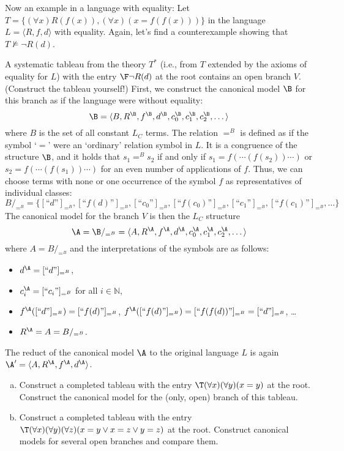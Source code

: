 \begin{example}
    Now an example in a language with equality: Let $T=\{(\forall x)R(f(x)),(\forall x)(x=f(f(x)))\}$ in the language $L=\langle R,f,d \rangle$ with equality. Again, let's find a counterexample showing that $T\not\models\neg R(d)$. 

    A systematic tableau from the theory $T^*$ (i.e., from $T$ extended by the axioms of equality for $L$) with the entry $\F\neg R(d)$ at the root contains an open branch $V$. (Construct the tableau yourself!) First, we construct the canonical model $\B$ for this branch as if the language were without equality:
    $$
    \B=\langle B,R^\B,f^\B,d^\B,c_0^\B,c_1^\B,c_2^\B,\dots\rangle
    $$
    where $B$ is the set of all constant $L_C$ terms. The relation $=^B$ is defined as if the symbol `$=$' were an `ordinary' relation symbol in $L$. It is a congruence of the structure $\B$, and it holds that $s_1=^B s_2$ if and only if $s_1=f(\cdots (f(s_2))\cdots)$ or $s_2=f(\cdots (f(s_1))\cdots)$ for an even number of applications of $f$. Thus, we can choose terms with none or one occurrence of the symbol $f$ as representatives of individual classes:
    $$
        B/_{=^B} = \{[\text{``$d$''}]_{=^B},[\text{``$f(d)$''}]_{=^B},[\text{``$c_0$''}]_{=^B},[\text{``$f(c_0)$''}]_{=^B},[\text{``$c_1$''}]_{=^B},[\text{``$f(c_1)$''}]_{=^B},\dots\}
    $$
    The canonical model for the branch $V$ is then the $L_C$ structure 
    $$
    \A=\B/_{=^B}=\langle A,R^\A,f^\A,d^\A,c_0^\A,c_1^\A,c_2^\A,\dots\rangle
    $$
    where $A=B/_{=^B}$ and the interpretations of the symbols are as follows:
    \begin{itemize}
        \item $d^\A=[\text{``$d$''}]_{=^B}$,
        \item $c^\A_i=[\text{``$c_i$''}]_{=^B}$ for all $i\in \mathbb N$,
        \item $f^\A([\text{``$d$''}]_{=^B})=[\text{``$f(d)$''}]_{=^B}$, $f^\A([\text{``$f(d)$''}]_{=^B})=[\text{``$f(f(d))$''}]_{=^B}=[\text{``$d$''}]_{=^B}$, \dots
        \item $R^\A=A=B/_{=^B}$.
    \end{itemize}
    The reduct of the canonical model $\A$ to the original language $L$ is again $\A'=\langle A, R^\A, f^\A, d^\A\rangle$.
\end{example}

\begin{exercise}
    \begin{enumerate}[(a)]
        \item Construct a completed tableau with the entry $\T (\forall x)(\forall y)(x=y)$ at the root. Construct the canonical model for the (only, open) branch of this tableau.
        \item Construct a completed tableau with the entry $\T (\forall x)(\forall y)(\forall z)(x=y\lor x=z \lor y=z)$ at the root. Construct canonical models for several open branches and compare them.
    \end{enumerate}
\end{exercise} 

